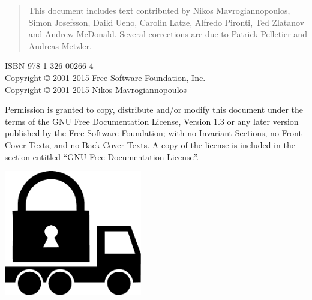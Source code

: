 \thispagestyle{empty}

\begin{quotation}
This document includes text contributed by
Nikos Mavrogiannopoulos, Simon Josefsson, Daiki Ueno, 
Carolin Latze, Alfredo Pironti, Ted Zlatanov and Andrew McDonald. Several corrections are due
to Patrick Pelletier and Andreas Metzler.
\end{quotation}



\begin{flushleft}
ISBN 978-1-326-00266-4\\
Copyright \copyright{} 2001-2015 Free Software Foundation, Inc.\\
Copyright \copyright{} 2001-2015 Nikos Mavrogiannopoulos
\end{flushleft}

\begin{flushleft}
Permission is granted to copy, distribute and/or modify this document
under the terms of the GNU Free Documentation License, Version 1.3 or
any later version published by the Free Software Foundation; with no
Invariant Sections, no Front-Cover Texts, and no Back-Cover Texts.  A
copy of the license is included in the section entitled ``GNU Free
Documentation License''.
\end{flushleft}

\newpage
\thispagestyle{empty}

\begin{center}
\includegraphics[width=6cm]{../gnutls-logo.pdf}
\end{center}


